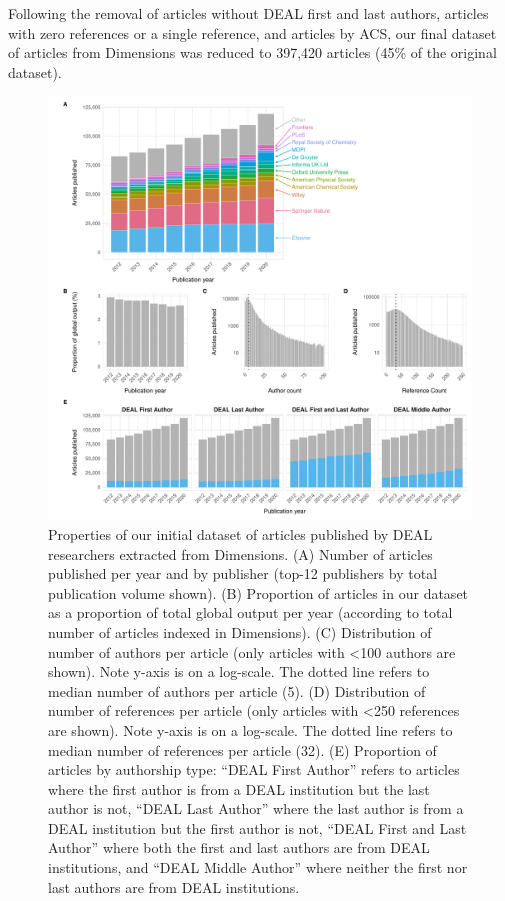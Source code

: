 \documentclass[
]{article}
\begin{document}
Following the removal of articles without DEAL first and last authors, articles with zero references or a single reference, and articles by ACS, our final dataset of articles from Dimensions was reduced to 397,420 articles (45\% of the original dataset).



\begin{figure}

{\centering \includegraphics{analysis_files/figure-latex/items-overview-1} 

}

\caption{Properties of our initial dataset of articles published by DEAL researchers extracted from Dimensions. (A) Number of articles published per year and by publisher (top-12 publishers by total publication volume shown). (B) Proportion of articles in our dataset as a proportion of total global output per year (according to total number of articles indexed in Dimensions). (C) Distribution of number of authors per article (only articles with \textless100 authors are shown). Note y-axis is on a log-scale. The dotted line refers to median number of authors per article (5). (D) Distribution of number of references per article (only articles with \textless250 references are shown). Note y-axis is on a log-scale. The dotted line refers to median number of references per article (32). (E) Proportion of articles by authorship type: ``DEAL First Author'' refers to articles where the first author is from a DEAL institution but the last author is not, ``DEAL Last Author'' where the last author is from a DEAL institution but the first author is not, ``DEAL First and Last Author'' where both the first and last authors are from DEAL institutions, and ``DEAL Middle Author'' where neither the first nor last authors are from DEAL institutions.}\label{fig:items-overview}
\end{figure}
\end{document}
